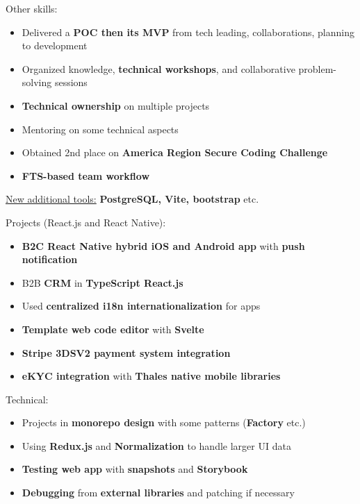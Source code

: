 \documentclass[10pt,a4paper,ragged2e,withhyper]{altacv}
\begin{document}
\medskip
Other skills:
\begin{itemize}
  \item Delivered a \textbf{POC then its MVP} from tech leading, collaborations, planning to development
  \item Organized knowledge, \textbf{technical workshops}, and collaborative problem-solving sessions
  \item \textbf{Technical ownership} on multiple projects
  \item Mentoring on some technical aspects
  \item Obtained 2nd place on \textbf{America Region Secure Coding Challenge}
  \item \textbf{FTS-based team workflow}
\end{itemize}
\begin{itshape}
  \underline{New additional tools:}
  \small{\textbf{PostgreSQL, Vite, bootstrap} etc.}
\end{itshape}

\divider

\vspace{-.5\baselineskip}
\begin{minipage}[t]{0.45\textwidth}
  \vspace{0pt}
  Projects (React.js and React Native):
  \begin{itemize}
    \item \textbf{B2C React Native hybrid iOS and Android app} with \textbf{push notification}
    \item B2B \textbf{CRM} in \textbf{TypeScript React.js}
    \item Used \textbf{centralized i18n internationalization} for apps
    \item \textbf{Template web code editor} with \textbf{Svelte}
    \item \textbf{Stripe 3DSV2 payment system integration}
    \item \textbf{eKYC integration} with \textbf{Thales native mobile libraries}
  \end{itemize}
\end{minipage}
\hfill
\begin{minipage}[t]{0.45\textwidth}
  \vspace{0pt}
  Technical:
  \begin{itemize}
    \item Projects in \textbf{monorepo design} with some patterns (\textbf{Factory} etc.)
    \item Using \textbf{Redux.js} and \textbf{Normalization} to handle larger UI data
    \item \textbf{Testing web app} with \textbf{snapshots} and \textbf{Storybook}
    \item \textbf{Debugging} from \textbf{external libraries} and patching if necessary
  \end{itemize}
\end{minipage}
\end{document}
